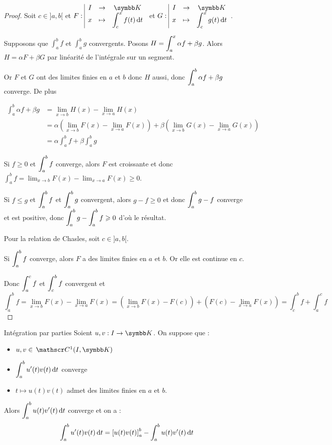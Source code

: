 \begin{proof}
    Soit $c \in ]a, b[$ et $\fonction F I \K x {\int_c^x f (t) \dt}$ et $\fonction G I \K x {\int_c^x g(t) \dt}$.

    Supposons que $\int_{a }^{b } f$ et $\int_{a }^{b } g$ convergents. Posons 
    $H = \displaystyle \int_{a }^{x } \alpha f + \beta g$. Alors $H = \alpha F + \beta G$ par 
    linéarité de l'intégrale sur un segment. 

    Or $F$ et $G$ ont des limites finies en $a$ et $b$ donc $H$ aussi, donc
    $\displaystyle \int_{a }^{b } \alpha f + \beta g$ converge.
    De plus 

    \begin{align}
        \int_{a }^{b } \alpha f + \beta g &= \lim_{x \to b} H(x) - \lim_{x \to a} H(x) \\
        &= \alpha \left( \lim_{x \to b} F(x) - \lim_{x \to a} F(x) \right) + \beta \left( \lim_{x \to b} G(x) - \lim_{x \to a} G(x) \right) \\
        &= \alpha \int_{a }^{b } f + \beta \int_{a }^{b } g
    \end{align}

    \lvspace Si $f \geqslant 0$ et $\displaystyle \int_{a }^{b } f$ converge, alors 
    $F$ est croissante et donc $\int_{a}^b f = \lim_{x \to b} F(x) - \lim_{x \to a} F(x) \geqslant 0$.

    \lvspace Si $f \leqslant g$ et $\displaystyle \int_{a }^{b } f$ et $\displaystyle \int_{a }^{b } g$ convergent, alors 
    $g - f \geqslant 0$ et donc $\displaystyle \int_{a }^{b } g - f$ converge et est positive, donc
    $\displaystyle \int_{a }^{b } g - \int_{a }^{b } f \geqslant 0$ d'où le résultat.

    \lvspace Pour la relation de Chasles, soit $c \in ]a, b[$.

    Si $\displaystyle \int_{a }^{b } f$ converge, alors $F$ a des limites finies en $a$ et $b$. Or elle 
    est continue en $c$. 

    Donc $\displaystyle \int_{a }^{c }f$ et $\displaystyle \int_{c }^{b } f$ convergent et
    $$ \int_{a }^{b } f = \lim_{x \to b} F(x) - \lim_{x \to a} F(x) = \left( \lim_{x \to b} F(x) - F(c) \right) + \left( F(c) - \lim_{x \to a} F(x) \right) = \int_{c }^{b } f + \int_{a }^{c } f $$
\end{proof}

\begin{theoreme}{Intégration par parties}{}
    Soient $u, v : I \to \K $. On suppose que :
    \begin{itemize}
        \item $u, v \in  \mc 1 (I, \K)$
        \item $\displaystyle \int_{a }^{b } u'(t) v(t) \,\mathrm{d}t$ converge
        \item $t \mapsto u(t) v(t)$ admet des limites finies en $a$ et $b$.
    \end{itemize} 

    Alors $\displaystyle \int_a^b u(t) v'(t) \,\mathrm{d}t$ converge et on a :
    $$ \int_a^b u'(t) v(t) \,\mathrm{d}t = \left[ u(t) v(t) \right]_a^b - \int_a^b u(t) v'(t) \,\mathrm{d}t $$
\end{theoreme}


